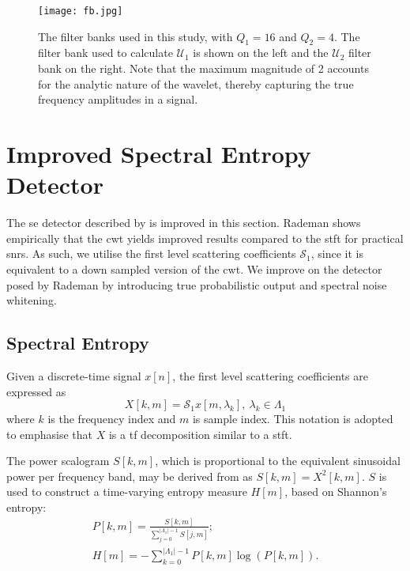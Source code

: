 {\begin{figure}[h]
    \centering
    \texttt{[image: fb.jpg]}
    \caption{The filter banks used in this study, with $Q_1 = 16$ and $Q_2 = 4$. The filter bank used to calculate $\mathcal{U}_1$ is shown on the left and the $\mathcal{U}_2$ filter bank on the right. Note that the maximum magnitude of 2 accounts for the analytic nature of the wavelet, thereby capturing the true frequency amplitudes in a signal.}
    \label{fig:fb}
\end{figure}

\clearpage
\section{Improved Spectral Entropy Detector}
The \ac{se} detector described by \citet{mypaper} is improved in this section. Rademan shows empirically that the \ac{cwt} yields improved results compared to the \ac{stft} for practical \acp{snr}. As such, we utilise the first level scattering coefficients $\mathcal{S}_{1}$, since it is equivalent to a down sampled version of the \ac{cwt}. We improve on the detector posed by Rademan by introducing true probabilistic output and spectral noise whitening.

\subsection{Spectral Entropy}
\label{sec:spectral_entropy}
Given a discrete-time signal $x[n]$, the first level scattering coefficients are expressed as
\begin{equation*}
	X[k, m] = \mathcal{S}_1x[m, \lambda_k],\ \lambda_k \in \Lambda_1
\end{equation*}
where $k$ is the frequency index and $m$ is sample index. This notation is adopted to emphasise that $X$ is a \ac{tf} decomposition similar to a \ac{stft}.

The power scalogram $S[k, m]$, which is proportional to the equivalent sinusoidal power per frequency band, may be derived from as $S[k,m] = X^2[k, m]$. $S$ is used to construct a time-varying entropy measure $H[m]$, based on Shannon's entropy:
\begin{gather}
\label{eqn:specdist}
	P[k,m] = \frac{S[k,m]}{\sum_{j=0}^{|\Lambda_1|-1} S[j,m]}; \\
\label{eqn:entropy}
	H[m] = - \sum_{k=0}^{|\Lambda_1|-1} P[k,m] \log (P[k,m]).
\end{gather}


}
